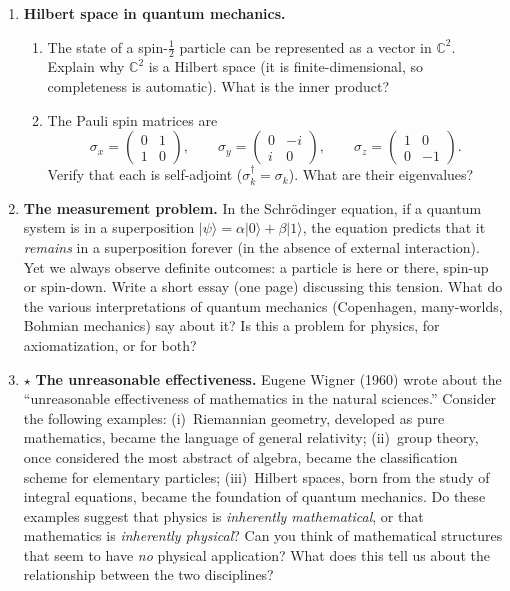 \begin{enumerate}
    \item \textbf{Hilbert space in quantum mechanics.}
    \begin{enumerate}
        \item The state of a spin-$\frac{1}{2}$ particle can be represented as a vector in $\mathbb{C}^2$. Explain why $\mathbb{C}^2$ is a Hilbert space (it is finite-dimensional, so completeness is automatic). What is the inner product?
        \item The Pauli spin matrices are
        \[
            \sigma_x = \begin{pmatrix} 0 & 1 \\ 1 & 0 \end{pmatrix}, \qquad
            \sigma_y = \begin{pmatrix} 0 & -i \\ i & 0 \end{pmatrix}, \qquad
            \sigma_z = \begin{pmatrix} 1 & 0 \\ 0 & -1 \end{pmatrix}.
        \]
        Verify that each is self-adjoint ($\sigma_k^\dagger = \sigma_k$). What are their eigenvalues?
    \end{enumerate}

    \item \textbf{The measurement problem.} In the Schr\"odinger equation, if a quantum system is in a superposition $|\psi\rangle = \alpha|0\rangle + \beta|1\rangle$, the equation predicts that it \emph{remains} in a superposition forever (in the absence of external interaction). Yet we always observe definite outcomes: a particle is here or there, spin-up or spin-down. Write a short essay (one page) discussing this tension. What do the various interpretations of quantum mechanics (Copenhagen, many-worlds, Bohmian mechanics) say about it? Is this a problem for physics, for axiomatization, or for both?

    \item $\star$ \textbf{The unreasonable effectiveness.} Eugene Wigner (1960) wrote about the ``unreasonable effectiveness of mathematics in the natural sciences.'' Consider the following examples: (i)~Riemannian geometry, developed as pure mathematics, became the language of general relativity; (ii)~group theory, once considered the most abstract of algebra, became the classification scheme for elementary particles; (iii)~Hilbert spaces, born from the study of integral equations, became the foundation of quantum mechanics. Do these examples suggest that physics is \emph{inherently mathematical}, or that mathematics is \emph{inherently physical}? Can you think of mathematical structures that seem to have \emph{no} physical application? What does this tell us about the relationship between the two disciplines?


\end{enumerate}
